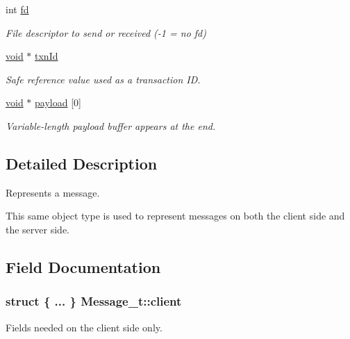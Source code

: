 \begin{DoxyCompactItemize}
\begin{tabbing}
\end{tabbing}\item 
int \hyperlink{struct_message__t_a31bc185a92a3c2d60bd891eebd8877c7}{fd}
\begin{DoxyCompactList}\small\item\em File descriptor to send or received (-\/1 = no fd) \end{DoxyCompactList}\item 
\hyperlink{_t_e_m_p_l_a_t_e__cdef_8h_ac9c84fa68bbad002983e35ce3663c686}{void} $\ast$ \hyperlink{struct_message__t_a60ed9a745c56fe5267a30341e1f637e6}{txn\+Id}
\begin{DoxyCompactList}\small\item\em Safe reference value used as a transaction ID. \end{DoxyCompactList}\item 
\hyperlink{_t_e_m_p_l_a_t_e__cdef_8h_ac9c84fa68bbad002983e35ce3663c686}{void} $\ast$ \hyperlink{struct_message__t_afa4218314a81845b88c91593fff1975d}{payload} \mbox{[}0\mbox{]}
\begin{DoxyCompactList}\small\item\em Variable-\/length payload buffer appears at the end. \end{DoxyCompactList}\end{DoxyCompactItemize}


\subsection{Detailed Description}
Represents a message.

This same object type is used to represent messages on both the client side and the server side. 

\subsection{Field Documentation}
\subsubsection[{\texorpdfstring{client}{client}}]{\setlength{\rightskip}{0pt plus 5cm}struct \{ ... \} 
         Message\+\_\+t\+::client}\hypertarget{struct_message__t_aa4dc59a624915dc9e85a1741030d0fbe}{}\label{struct_message__t_aa4dc59a624915dc9e85a1741030d0fbe}


Fields needed on the client side only. 

